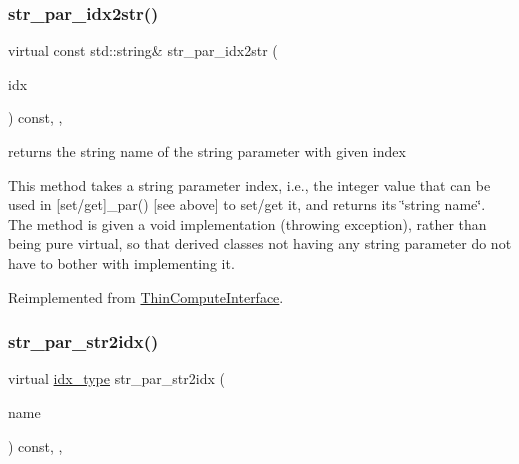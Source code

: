 \subsubsection{\texorpdfstring{str\+\_\+par\+\_\+idx2str()}{str\_par\_idx2str()}}
{\footnotesize\ttfamily virtual const std\+::string\& str\+\_\+par\+\_\+idx2str (\begin{DoxyParamCaption}\item[{const \mbox{\hyperlink{class_s_m_spp__di__unipi__it_1_1_thin_compute_interface_aa3d710629ad8c434286726ad810c3b47}{idx\+\_\+type}}}]{idx }\end{DoxyParamCaption}) const\hspace{0.3cm}{\ttfamily [inline]}, {\ttfamily [override]}, {\ttfamily [virtual]}}



returns the string name of the string parameter with given index 

This method takes a string parameter index, i.\+e., the integer value that can be used in \mbox{[}set/get\mbox{]}\+\_\+par() \mbox{[}see above\mbox{]} to set/get it, and returns its \char`\"{}string name\char`\"{}. The method is given a void implementation (throwing exception), rather than being pure virtual, so that derived classes not having any string parameter do not have to bother with implementing it. 

Reimplemented from \mbox{\hyperlink{class_s_m_spp__di__unipi__it_1_1_thin_compute_interface_ad886220da008681ec350ce43aac421ee}{Thin\+Compute\+Interface}}.

\mbox{\label{class_s_m_spp__di__unipi__it_1_1_f_row_constraint_a0ddaa949b3db7b6adeb4ed8d623637ca}} 
\subsubsection{\texorpdfstring{str\+\_\+par\+\_\+str2idx()}{str\_par\_str2idx()}}
{\footnotesize\ttfamily virtual \mbox{\hyperlink{class_s_m_spp__di__unipi__it_1_1_thin_compute_interface_aa3d710629ad8c434286726ad810c3b47}{idx\+\_\+type}} str\+\_\+par\+\_\+str2idx (\begin{DoxyParamCaption}\item[{const std\+::string \&}]{name }\end{DoxyParamCaption}) const\hspace{0.3cm}{\ttfamily [inline]}, {\ttfamily [override]}, {\ttfamily [virtual]}}



